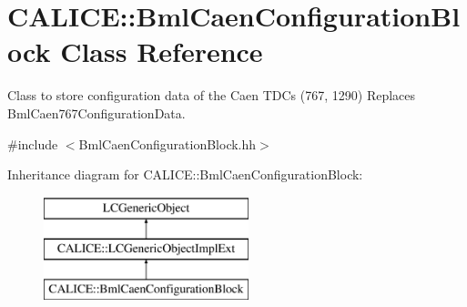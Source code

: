 \section{C\-A\-L\-I\-C\-E\-:\-:Bml\-Caen\-Configuration\-Block Class Reference}
\label{classCALICE_1_1BmlCaenConfigurationBlock}


Class to store configuration data of the Caen T\-D\-Cs (767, 1290) Replaces Bml\-Caen767\-Configuration\-Data.  




{\ttfamily \#include $<$Bml\-Caen\-Configuration\-Block.\-hh$>$}

Inheritance diagram for C\-A\-L\-I\-C\-E\-:\-:Bml\-Caen\-Configuration\-Block\-:\begin{figure}[H]
\begin{center}
\leavevmode
\includegraphics[height=3.000000cm]{classCALICE_1_1BmlCaenConfigurationBlock}
\end{center}
\end{figure}
